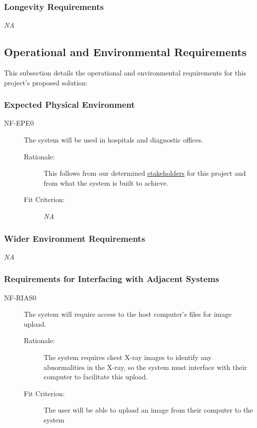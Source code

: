 \documentclass[12pt]{article}
\begin{document}
\subsubsection{Longevity Requirements}
\textit{NA}

\subsection{Operational and Environmental Requirements}
This subsection details the operational and environmental requirements for this project's proposed solution:

\subsubsection{Expected Physical Environment}
\begin{description}
    \item[NF-EPE0] The system will be used in hospitals and diagnostic offices. 
    \begin{description}
        \item[Rationale:] This follows from our determined \hyperlink{Users}{stakeholders} for this project and from what the system is built to achieve. 
        \item[Fit Criterion:] \textit{NA}
    \end{description}
\end{description}

\subsubsection{Wider Environment Requirements}
\textit{NA}

\subsubsection{Requirements for Interfacing with Adjacent Systems}
\begin{description}
    \item[NF-RIAS0] The system will require access to the host computer's files for image upload. 
    \begin{description}
        \item[Rationale:] The system requires chest X-ray images to identify any abnormalities in the X-ray, so the system must interface with their computer to facilitate this upload.  
        \item[Fit Criterion:] The user will be able to upload an image from their computer to the system
    \end{description}
\end{description}
\end{document}
